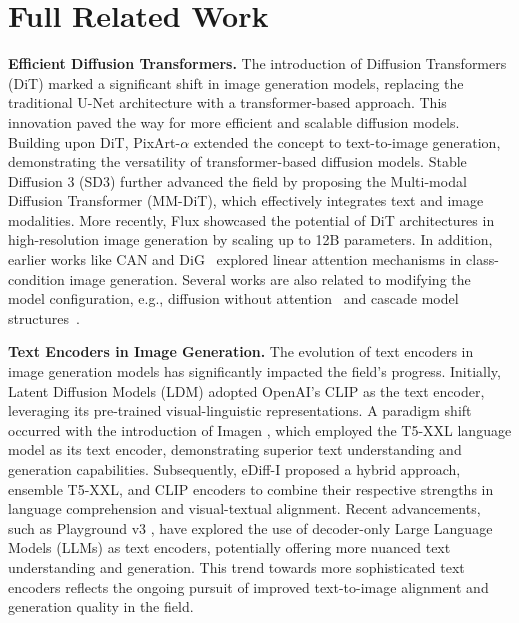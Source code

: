 \section{Full Related Work}

\noindent \textbf{Efficient Diffusion Transformers.}
The introduction of Diffusion Transformers (DiT) \citep{peebles2023scalable} marked a significant shift in image generation models, replacing the traditional U-Net architecture with a transformer-based approach. This innovation paved the way for more efficient and scalable diffusion models. Building upon DiT, PixArt-$\alpha$ \citep{chenpixart} extended the concept to text-to-image generation, demonstrating the versatility of transformer-based diffusion models. Stable Diffusion 3 (SD3) \citep{esser2024scaling} further advanced the field by proposing the Multi-modal Diffusion Transformer (MM-DiT), which effectively integrates text and image modalities. More recently, Flux \citep{FLUX} showcased the potential of DiT architectures in high-resolution image generation by scaling up to 12B parameters. In addition, earlier works like CAN \citep{cai2024condition} and DiG~\citep{zhu2024dig} explored linear attention mechanisms in class-condition image generation. Several works are also related to modifying the model configuration, e.g., diffusion without attention~\citep{yan2024diffusion, teng2024dim} and cascade model structures~\citep{pernias2023wuerstchen, ren2024ultrapixel,tian2024u}.


\noindent \textbf{Text Encoders in Image Generation.}
The evolution of text encoders in image generation models has significantly impacted the field's progress. Initially, Latent Diffusion Models (LDM) \citep{rombach2022high} adopted OpenAI's CLIP as the text encoder, leveraging its pre-trained visual-linguistic representations. A paradigm shift occurred with the introduction of Imagen \citep{saharia2022photorealistic}, which employed the T5-XXL language model as its text encoder, demonstrating superior text understanding and generation capabilities. Subsequently, eDiff-I \citep{balaji2022ediff} proposed a hybrid approach, ensemble T5-XXL, and CLIP encoders to combine their respective strengths in language comprehension and visual-textual alignment. Recent advancements, such as Playground v3 \citep{li2024playground}, have explored the use of decoder-only Large Language Models (LLMs) as text encoders, potentially offering more nuanced text understanding and generation. This trend towards more sophisticated text encoders reflects the ongoing pursuit of improved text-to-image alignment and generation quality in the field.

